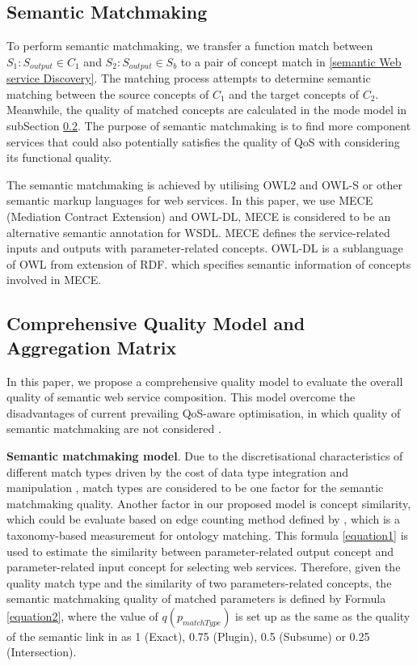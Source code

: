 \documentclass{llncs}
\begin{document}
\subsection{Semantic Matchmaking} \label{semantic_matchmaking}
To perform semantic matchmaking, we transfer a function match between $S_{1}: S_{output} \in C_{1}$ and $S_{2}:S_{output} \in S_{b}$ to a pair of concept match in \ref{semantic Web service Discovery}. The matching process attempts to determine semantic matching between the source concepts of $C_{1}$ and the target concepts of $C_{2}$. Meanwhile, the quality of matched concepts are calculated in the mode model in subSection \ref{qualityModel}. The purpose of semantic matchmaking is to find more component services that could also potentially satisfies the quality of QoS with considering its functional quality.

The semantic matchmaking is achieved by utilising OWL2 and OWL-S or other semantic markup languages for web services. In this paper, we use MECE (Mediation Contract Extension) \cite{bleul2008self} and OWL-DL, MECE is considered to be an alternative semantic annotation for WSDL. MECE defines the service-related inputs and outputs with parameter-related concepts. OWL-DL is a sublanguage of OWL from extension of RDF. which specifies semantic information of concepts involved in MECE. 

\subsection{Comprehensive Quality Model and Aggregation Matrix}\label{qualityModel}
In this paper, we propose a comprehensive quality model to evaluate the overall quality of semantic web service composition. This model overcome the disadvantages of current prevailing QoS-aware optimisation, in which quality of semantic matchmaking are not considered \cite{bansal2016generalized,mier2015integrated,da2016particle,da2015graphevol,yu2013adaptive}.

\textbf{Semantic matchmaking model}. Due to the discretisational characteristics of different match types driven by the cost of  data type integration and manipulation \cite{lecue2009optimizing}, match types are considered to be one factor for the semantic matchmaking quality. Another factor in our proposed model is concept similarity, which could be evaluate based on edge counting method defined by \cite{shet2012new}, which is a taxonomy-based measurement for ontology matching. This formula \ref{equation1} is used to estimate the similarity between parameter-related output concept and parameter-related input concept for selecting web services. Therefore, given the quality match type and the similarity of two parameters-related concepts, the semantic matchmaking quality of matched parameters is defined by Formula \ref{equation2}, where the value of $q(p_ {matchType})$ is set up as the same as the quality of the semantic link in \cite{lecue2009optimizing} as 1 (Exact), 0.75 (Plugin), 0.5 (Subsume) or 0.25 (Intersection). 
\end{document}
